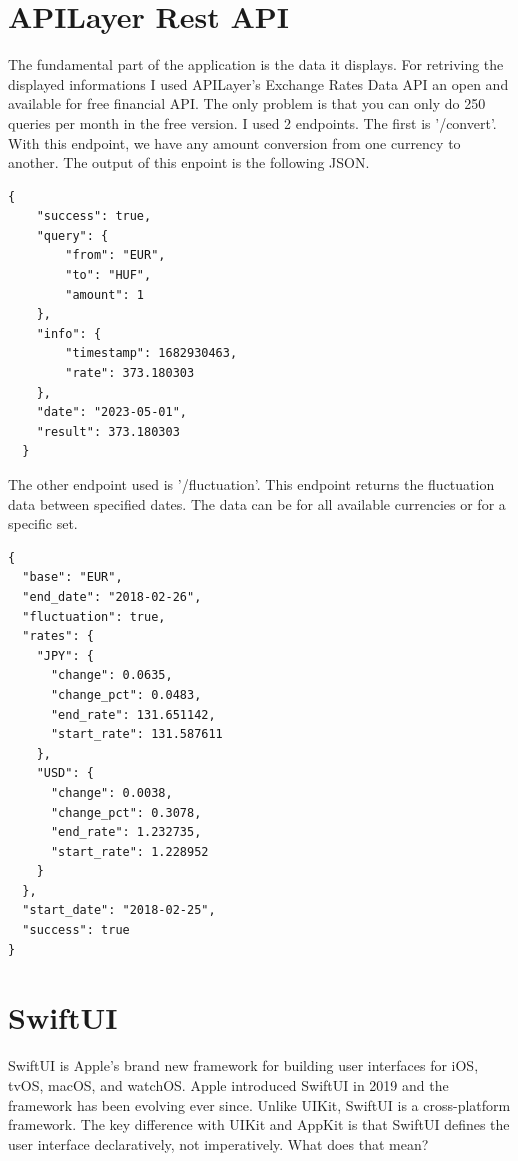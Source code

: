 \documentclass[11pt,a4paper,oneside]{report}
\begin{document}
\section{APILayer Rest API}

The fundamental part of the application is the data it displays. For retriving the displayed informations I used APILayer's Exchange Rates Data API an open and available for free financial API.  The only problem is that you can only do 250 queries per month in the free version. I used 2 endpoints. The first is '/convert'. With this endpoint, we have any amount conversion from one currency to another. The output of this enpoint is the following JSON.

\begin{lstlisting}[frame=single,float=!ht,caption=JSON from /convert endpoint, label=listing:Bibtex]
  {
    "success": true,
    "query": {
        "from": "EUR",
        "to": "HUF",
        "amount": 1
    },
    "info": {
        "timestamp": 1682930463,
        "rate": 373.180303
    },
    "date": "2023-05-01",
    "result": 373.180303
  }
\end{lstlisting}

The other endpoint used is '/fluctuation'. This endpoint returns the fluctuation data between specified dates. The data can be for all available currencies or for a specific set.
\begin{lstlisting}[frame=single,float=!ht,caption=JSON from /fluctuation endpoint, label=listing:Bibtex]
{
  "base": "EUR",
  "end_date": "2018-02-26",
  "fluctuation": true,
  "rates": {
    "JPY": {
      "change": 0.0635,
      "change_pct": 0.0483,
      "end_rate": 131.651142,
      "start_rate": 131.587611
    },
    "USD": {
      "change": 0.0038,
      "change_pct": 0.3078,
      "end_rate": 1.232735,
      "start_rate": 1.228952
    }
  },
  "start_date": "2018-02-25",
  "success": true
}
\end{lstlisting}

\section{SwiftUI}

SwiftUI is Apple's brand new framework for building user interfaces for iOS, tvOS, macOS, and watchOS. Apple introduced SwiftUI in 2019 and the framework has been evolving ever since. Unlike UIKit, SwiftUI is a cross-platform framework. The key difference with UIKit and AppKit is that SwiftUI defines the user interface declaratively, not imperatively. What does that mean?
\end{document}
